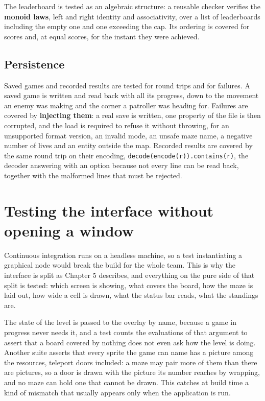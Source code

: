 The leaderboard is tested as an algebraic structure: a reusable checker verifies the \textbf{monoid laws}, left and
right identity and associativity, over a list of leaderboards including the empty one and one exceeding the cap. Its
ordering is covered for scores and, at equal scores, for the instant they were achieved.

\subsection{Persistence}

Saved games and recorded results are tested for round trips and for failures. A saved game is written and read back
with all its progress, down to the movement an enemy was making and the corner a patroller was heading for. Failures
are covered by \textbf{injecting them}: a real save is written, one property of the file is then corrupted, and the
load is required to refuse it without throwing, for an unsupported format version, an invalid mode, an unsafe maze
name, a negative number of lives and an entity outside the map. Recorded results are covered by the same round trip on
their encoding, \texttt{decode(encode(r)).contains(r)}, the decoder answering with an option because not every line
can be read back, together with the malformed lines that must be rejected.

\section{Testing the interface without opening a window}

Continuous integration runs on a headless machine, so a test instantiating a graphical node would break the build for
the whole team. This is why the interface is split as Chapter 5 describes, and everything on the pure side of that
split is tested: which screen is showing, what covers the board, how the maze is laid out, how wide a cell is drawn,
what the status bar reads, what the standings are.

The state of the level is passed to the overlay by name, because a game in progress never needs it, and a test counts
the evaluations of that argument to assert that a board covered by nothing does not even ask how the level is doing.
Another suite asserts that every sprite the game can name has a picture among the resources, teleport doors included:
a maze may pair more of them than there are pictures, so a door is drawn with the picture its number reaches by
wrapping, and no maze can hold one that cannot be drawn. This catches at build time a kind of mismatch that usually
appears only when the application is run.

